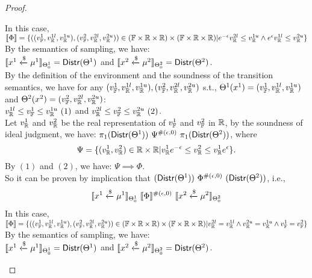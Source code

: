 \documentclass[a4paper,11pt]{article}
\begin{document}
\begin{proof}
\begin{itemize}
	In this case, 
	$\llbracket \Phi \rrbracket = 
	\{((v_{\mathbb{F}}^1, v_{\mathbb{R}}^{1l}, v_{\mathbb{R}}^{1u}), (v_{\mathbb{F}}^2, v_{\mathbb{R}}^{2l}, v_{\mathbb{R}}^{2u})) 
	\in (\mathbb{F} \times \mathbb{R} \times \mathbb{R}) \times (\mathbb{F} \times \mathbb{R} \times \mathbb{R})
	|
	e^{-\epsilon} v_{\mathbb{R}}^{2l} \leq v_{\mathbb{R}}^{1u}
	\land
	e^{\epsilon} v_{\mathbb{R}}^{1l} \leq v_{\mathbb{R}}^{2u}
	\}$
	\\
	By the semantics of sampling, we have:\\
	$\llbracket x^1 \xleftarrow{\$} \mu^1 \rrbracket_{\Theta^1_0} = \mathsf{Distr}(\Theta^1)$ and 
	$\llbracket x^2 \xleftarrow{\$} \mu^2 \rrbracket_{\Theta^2_0} = \mathsf{Distr}(\Theta^2)$. \\
	By the definition of the environment and the soundness of the transition semantics, we have for any $(v_{\mathbb{F}}^1, v_{\mathbb{R}}^{1l}, v_{\mathbb{R}}^{1u}), (v_{\mathbb{F}}^2, v_{\mathbb{R}}^{2l}, v_{\mathbb{R}}^{2u})$ s.t.,
	$\Theta^1 (x^1) = (v_{\mathbb{F}}^1, v_{\mathbb{R}}^{1l}, v_{\mathbb{R}}^{1u})$
	and
	$\Theta^2 (x^2) = (v_{\mathbb{F}}^2, v_{\mathbb{R}}^{2l}, v_{\mathbb{R}}^{2u})$:
	\\
	$ v_{\mathbb{R}}^{1l} \leq v_{\mathbb{F}}^1 \leq v_{\mathbb{R}}^{1u} ~ (1)$ 
	and
	$ v_{\mathbb{R}}^{2l} \leq v_{\mathbb{F}}^2 \leq v_{\mathbb{R}}^{2u} ~ (2)$.
	\\
	Let $v_{\mathbb{R}}^1$ and $v_{\mathbb{R}}^2$ be the real representation of $v_{\mathbb{F}}^1$ and $v_{\mathbb{F}}^2$ in $\mathbb{R}$, by the soundness of ideal judgment, we have:
	$\pi_1 (\mathsf{Distr}(\Theta^1)) ~ \Psi^{\#(\epsilon, 0)} ~ \pi_1 (\mathsf{Distr}(\Theta^2))$, where
	\[
		\Psi = \{(v_{\mathbb{R}}^1, v_{\mathbb{R}}^2) \in \mathbb{R} \times \mathbb{R}
		| 
		v_{\mathbb{R}}^1 e^{-\epsilon} 
		\leq v_{\mathbb{R}}^2
		\leq v_{\mathbb{R}}^1 e^{\epsilon} \}.
	\]
	By $(1)$ and $(2)$, we have:
	$\Psi \implies \Phi$.
	\\
	So it can be proven by implication that 
	$(\mathsf{Distr}(\Theta^1)) ~ \Phi^{\#(\epsilon, 0)} ~ (\mathsf{Distr}(\Theta^2))$, i.e., 
	$$
	\llbracket x^1 \xleftarrow{\$} \mu^1 \rrbracket_{\Theta^1_0} 
		~ \llbracket \Phi \rrbracket^{\#(\epsilon, 0)} ~
		\llbracket x^2 \xleftarrow{\$} \mu^2 \rrbracket_{\Theta^2_0}
	$$
	In this case, 
	$\llbracket \Phi \rrbracket = 
	\{((v_{\mathbb{F}}^1, v_{\mathbb{R}}^{1l}, v_{\mathbb{R}}^{1u}), (v_{\mathbb{F}}^2, v_{\mathbb{R}}^{2l}, v_{\mathbb{R}}^{2u})) 
	\in (\mathbb{F} \times \mathbb{R} \times \mathbb{R}) \times (\mathbb{F} \times \mathbb{R} \times \mathbb{R})
	|
	v_{\mathbb{R}}^{2l} = v_{\mathbb{R}}^{1l}
	\land
	v_{\mathbb{R}}^{2u} = v_{\mathbb{R}}^{1u}
	\land
	v_{\mathbb{F}}^1 = v_{\mathbb{F}}^2
	\}$
	\\
	By the semantics of sampling, we have:\\
	$\llbracket x^1 \xleftarrow{\$} \mu^1 \rrbracket_{\Theta^1_0} = \mathsf{Distr}(\Theta^1)$ and 
	$\llbracket x^2 \xleftarrow{\$} \mu^2 \rrbracket_{\Theta^2_0} = \mathsf{Distr}(\Theta^2)$. \\

\end{itemize}
\end{proof}
\end{document}
